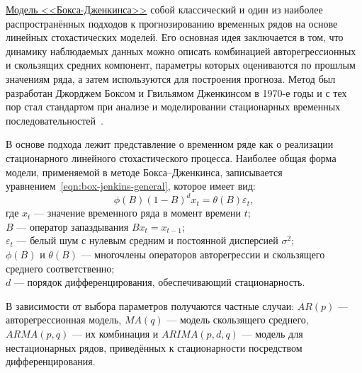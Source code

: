 \underline{Модель <<Бокса-Дженкинса>>} собой классический и один из наиболее распространённых подходов к прогнозированию временных рядов на основе линейных стохастических моделей. Его основная идея заключается в том, что динамику наблюдаемых данных можно описать комбинацией авторегрессионных и скользящих средних компонент, параметры которых оцениваются по прошлым значениям ряда, а затем используются для построения прогноза. Метод был разработан Джорджем Боксом и Гвильямом Дженкинсом в 1970-е годы и с тех пор стал стандартом при анализе и моделировании стационарных временных последовательностей~\cite{BoxJenkins2015, BrockwellDavis2016}.

В основе подхода лежит представление о временном ряде как о реализации стационарного линейного стохастического процесса. Наиболее общая форма модели, применяемой в методе Бокса–Дженкинса, записывается уравнением~\eqref{eqn:box-jenkins-general}, которое имеет вид:
\begin{equation}
\label{eqn:box-jenkins-general}
\phi(B)(1-B)^d x_t = \theta(B)\varepsilon_t,
\end{equation}
где $x_t$ --- значение временного ряда в момент времени $t$;\\
${}$\quad\enspace$B$ --- оператор запаздывания $Bx_t = x_{t-1}$;\\
${}$\quad\enspace$\varepsilon_t$ --- белый шум с нулевым средним и постоянной дисперсией $\sigma^2$;\\
${}$\quad\enspace$\phi(B)$ и $\theta(B)$ --- многочлены операторов авторегрессии и скользящего среднего соответственно;\\
${}$\quad\enspace$d$ --- порядок дифференцирования, обеспечивающий стационарность.

В зависимости от выбора параметров получаются частные случаи: $AR(p)$ — авторегрессионная модель, $MA(q)$ — модель скользящего среднего, $ARMA(p,q)$ — их комбинация и $ARIMA(p,d,q)$ — модель для нестационарных рядов, приведённых к стационарности посредством дифференцирования.

